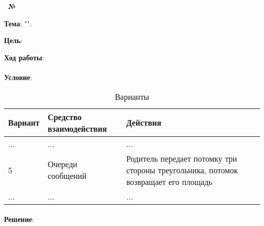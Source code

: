 \begin{center}
    \textbf{\titlePageTypeWork~№\titlePageNumberWork}
\end{center}

\textbf{Тема}: "\titlePageTopic".

\textbf{Цель}: 

\begin{center}
    \textbf{Ход работы}:
\end{center}

\paragraph{} \textbf{Условие}:

\begin{table}[h]
    \centering{}
    \caption{Варианты}
    \label{table:name}

    \begin{tabular}{|l|l|p{10cm}|}
        \hline
        Вариант &   Средство взаимодействия &   Действия    \\  \hline
        \hline
        ...     &   ...                     &   ...         \\  \hline
        5       &   Очереди сообщений       & Родитель передает потомку три стороны треугольника, потомок возвращает его площадь    \\  \hline
        ...     &   ...                     &   ...         \\  \hline
    \end{tabular}
\end{table}

\paragraph{} \textbf{Решение}:

